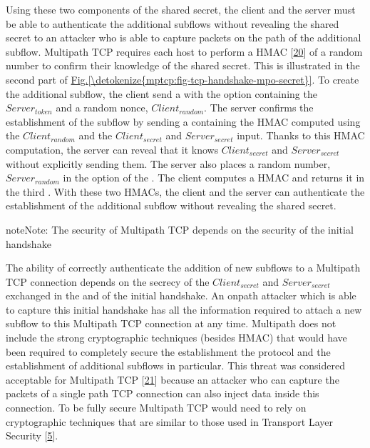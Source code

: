 \documentclass[letterpaper,10pt,english]{sphinxmanual}
\begin{document}
Using these two components of the shared secret, the client and the server must be able to authenticate the additional subflows without revealing the shared secret to an attacker who is able to capture packets on the path of the additional subflow. Multipath TCP requires each host to perform a HMAC {[}\hyperlink{cite.biblio:id2034}{20}{]} of a random number to confirm their knowledge of the shared secret. This is illustrated in the second part of \hyperref[\detokenize{mptcp:fig-tcp-handshake-mpo-secret}]{Fig.\@ \ref{\detokenize{mptcp:fig-tcp-handshake-mpo-secret}}}. To create the additional subflow, the client send a  with the  option containing the \(Server_{token}\) and a random nonce, \(Client_{random}\). The server confirms the establishment of the subflow by sending a  containing the HMAC computed using the \(Client_{random}\) and the \(Client_{secret}\) and \(Server_{secret}\) input. Thanks to this HMAC computation, the server can reveal that it knows \(Client_{secret}\) and \(Server_{secret}\) without explicitly sending them. The server also places a random number, \(Server_{random}\) in the  option of the . The client computes a HMAC and returns it in the third . With these two HMACs, the client and the server can authenticate the establishment of the additional subflow without revealing the shared secret.

\begin{sphinxadmonition}{note}{Note:}
\sphinxAtStartPar
The security of Multipath TCP depends on the security of the initial handshake

\sphinxAtStartPar
The ability of correctly authenticate the addition of new subflows to a Multipath TCP connection depends on the secrecy of the \(Client_{secret}\) and \(Server_{secret}\) exchanged in the  and  of the initial handshake. An on\sphinxhyphen{}path attacker which is able to capture this initial handshake has all the information required to attach a new subflow to this Multipath TCP connection at any time. Multipath does not include the strong cryptographic techniques (besides HMAC) that would have been required to completely secure the establishment the protocol and the establishment of additional subflows in particular. This threat was considered acceptable for Multipath TCP {[}\hyperlink{cite.biblio:id6032}{21}{]} because an attacker who can capture the packets of a single path TCP connection can also inject data inside this connection. To be fully secure Multipath TCP would need to rely on cryptographic techniques that are similar to those used in Transport Layer Security {[}\hyperlink{cite.biblio:id8271}{5}{]}.
\end{sphinxadmonition}
\end{document}
